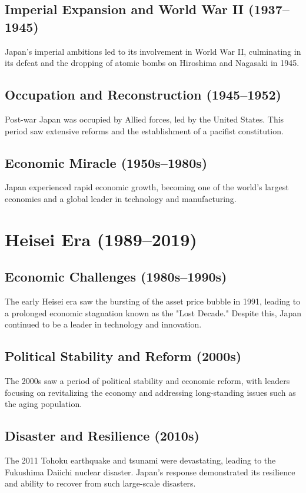 \documentclass[a4paper,12pt]{book}
\begin{document}
\subsection{Imperial Expansion and World War II (1937–1945)}
Japan’s imperial ambitions led to its involvement in World War II, culminating in its defeat and the dropping of atomic bombs on Hiroshima and Nagasaki in 1945.

\subsection{Occupation and Reconstruction (1945–1952)}
Post-war Japan was occupied by Allied forces, led by the United States. This period saw extensive reforms and the establishment of a pacifist constitution.

\subsection{Economic Miracle (1950s–1980s)}
Japan experienced rapid economic growth, becoming one of the world’s largest economies and a global leader in technology and manufacturing.

\section{Heisei Era (1989–2019)}
\label{sec:heisei-era}
\subsection{Economic Challenges (1980s–1990s)}
The early Heisei era saw the bursting of the asset price bubble in 1991, leading to a prolonged economic stagnation known as the "Lost Decade." Despite this, Japan continued to be a leader in technology and innovation.

\subsection{Political Stability and Reform (2000s)}
The 2000s saw a period of political stability and economic reform, with leaders focusing on revitalizing the economy and addressing long-standing issues such as the aging population.

\subsection{Disaster and Resilience (2010s)}
The 2011 Tohoku earthquake and tsunami were devastating, leading to the Fukushima Daiichi nuclear disaster. Japan’s response demonstrated its resilience and ability to recover from such large-scale disasters. 
\end{document}
